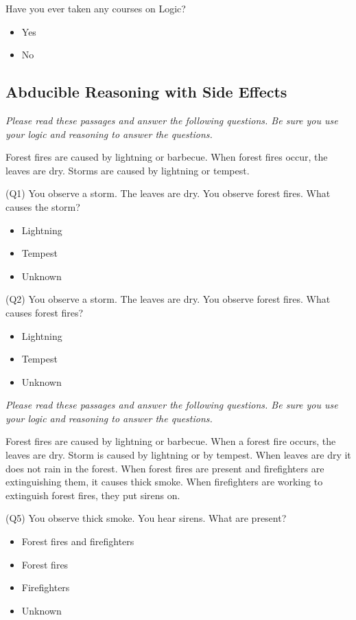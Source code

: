 \documentclass[]{interact}
\theoremstyle{plain}%
\theoremstyle{definition}
\theoremstyle{remark}
\begin{document}
Have you ever taken any courses on Logic?
\begin{itemize}
\item Yes
\item No
\end{itemize}

\subsection{Abducible Reasoning with Side Effects}

\emph{Please read these passages and answer the following questions. Be sure you use your logic and reasoning to answer the questions.}

Forest fires are caused by lightning or barbecue. When forest fires occur, the leaves are dry. Storms are caused by lightning or tempest.

(Q1) You observe a storm. The leaves are dry. You observe forest fires. What causes the storm?
\begin{itemize}
\item Lightning
\item Tempest
\item Unknown
\end{itemize}

(Q2) You observe a storm. The leaves are dry. You observe forest fires. What causes forest fires?
\begin{itemize}
\item Lightning
\item Tempest
\item Unknown
\end{itemize}

\emph{Please read these passages and answer the following questions. Be sure you use your logic and reasoning to answer the questions.}

Forest fires are caused by lightning or barbecue. When a forest fire occurs, the leaves are dry. Storm is caused by lightning or by tempest. When leaves are dry it does not rain in the forest. When forest fires are present and firefighters are extinguishing them, it causes thick smoke. When firefighters are working to extinguish forest fires, they put sirens on. 

(Q5) You observe thick smoke. You hear sirens. What are present?
\begin{itemize}
\item Forest fires and firefighters
\item Forest fires
\item Firefighters
\item Unknown
\end{itemize}
\end{document}
